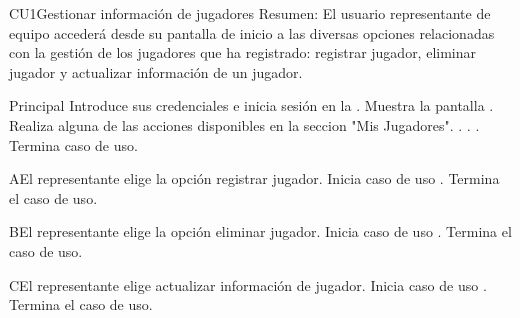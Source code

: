 \begin{UseCase}{CU1}{Gestionar información de jugadores}{
		Resumen: El usuario representante de equipo accederá desde su pantalla de inicio a las diversas opciones relacionadas con la gestión de los jugadores que ha registrado: registrar jugador, eliminar jugador y actualizar información de un jugador. }

\end{UseCase}
	\newpage
	\begin{UCtrayectoria}{Principal}
	\UCpaso[\UCactor] Introduce sus credenciales e inicia sesión en la .	
	\UCpaso Muestra la pantalla .
	\UCpaso[\UCactor] Realiza alguna de las acciones disponibles en la seccion "Mis Jugadores". . . .
	Termina caso de uso.
\end{UCtrayectoria}

	\begin{UCtrayectoriaA}{A}{El representante elige la opción registrar jugador.}
		\UCpaso Inicia caso de uso .
		\UCpaso Termina el caso de uso.
	\end{UCtrayectoriaA}

	\begin{UCtrayectoriaA}{B}{El representante elige la opción eliminar jugador.}
		\UCpaso Inicia caso de uso .
		\UCpaso Termina el caso de uso.
	\end{UCtrayectoriaA}
	
	\begin{UCtrayectoriaA}{C}{El representante elige actualizar información de jugador.}
		\UCpaso Inicia caso de uso .
		\UCpaso Termina el caso de uso.
	\end{UCtrayectoriaA}
